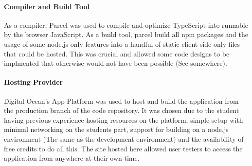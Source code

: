 \paragraph{Compiler and Build Tool}
As a compiler, Parcel was used to compile and optimize TypeScript into runnable by the browser JavaScript. As a build tool, parcel build all npm packages and the usage of some node.js only features into a handful of static client-side only files that could be hosted. This was crucial and allowed some code designs to be implmented that otherwise would not have been possible (See somewhere).

\paragraph{Hosting Provider}
Digital Ocean's App Platform was used to host and build the application from the production branch of the code repository. It was chosen due to the student having previous experience hosting resources on the platform, simple setup with minimal networking on the students part, support for building on a node.js environment (The same as the development environment) and the availability of free credits to do all this. The site hosted here allowed user testers to access the application from anywhere at their own time.